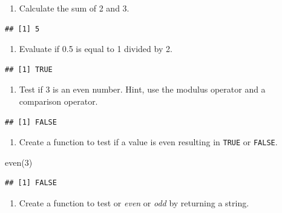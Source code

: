 \documentclass[
]{book}
\newenvironment{Shaded}{\begin{snugshade}}{\end{snugshade}}
\newcommand{\DecValTok}[1]{\textcolor[rgb]{0.00,0.00,0.81}{#1}}
\newcommand{\FunctionTok}[1]{\textcolor[rgb]{0.00,0.00,0.00}{#1}}
\newcommand{\NormalTok}[1]{#1}
\providecommand{\tightlist}{%
  \setlength{\itemsep}{0pt}\setlength{\parskip}{0pt}}
\begin{document}
\begin{enumerate}
\def\labelenumi{\arabic{enumi}.}
\setcounter{enumi}{2}
\tightlist
\item
  Calculate the sum of 2 and 3.
\end{enumerate}

\begin{verbatim}
## [1] 5
\end{verbatim}

\begin{enumerate}
\def\labelenumi{\arabic{enumi}.}
\setcounter{enumi}{3}
\tightlist
\item
  Evaluate if 0.5 is equal to 1 divided by 2.
\end{enumerate}

\begin{verbatim}
## [1] TRUE
\end{verbatim}

\begin{enumerate}
\def\labelenumi{\arabic{enumi}.}
\setcounter{enumi}{4}
\tightlist
\item
  Test if 3 is an even number. Hint, use the modulus operator and a comparison operator.
\end{enumerate}

\begin{verbatim}
## [1] FALSE
\end{verbatim}

\begin{enumerate}
\def\labelenumi{\arabic{enumi}.}
\setcounter{enumi}{5}
\tightlist
\item
  Create a function to test if a value is even resulting in \texttt{TRUE} or \texttt{FALSE}.
\end{enumerate}

\begin{Shaded}
\begin{Highlighting}[]
\FunctionTok{even}\NormalTok{(}\DecValTok{3}\NormalTok{)}
\end{Highlighting}
\end{Shaded}

\begin{verbatim}
## [1] FALSE
\end{verbatim}

\begin{enumerate}
\def\labelenumi{\arabic{enumi}.}
\setcounter{enumi}{6}
\tightlist
\item
  Create a function to test or \emph{even} or \emph{odd} by returning a string.
\end{enumerate}
\end{document}
